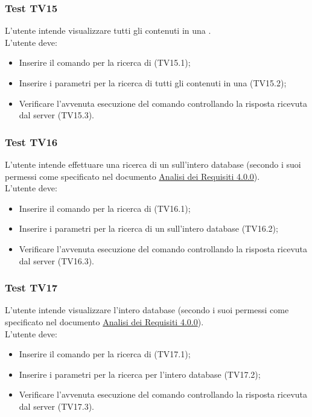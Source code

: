 \documentclass{scalatekids-article}
\begin{document}
\subsubsection{Test TV15}

L'utente intende visualizzare tutti gli  contenuti in una .\\
L'utente deve:
\begin{itemize}
\item Inserire il comando per la ricerca di  (TV15.1);
\item Inserire i parametri per la ricerca di tutti gli  contenuti in una  (TV15.2);
\item Verificare l'avvenuta esecuzione del comando controllando la risposta ricevuta dal server (TV15.3).
\end{itemize}

\subsubsection{Test TV16}

L'utente intende effettuare una ricerca di un  sull'intero database (secondo i suoi permessi come specificato nel documento \href{run:../Esterni/AnalisiDeiRequisiti\_v4.0.0.pdf}{Analisi dei Requisiti 4.0.0}).\\
L'utente deve:
\begin{itemize}
\item Inserire il comando per la ricerca di  (TV16.1);
\item Inserire i parametri per la ricerca di un  sull'intero database (TV16.2);
\item Verificare l'avvenuta esecuzione del comando controllando la risposta ricevuta dal server (TV16.3).
\end{itemize}

\subsubsection{Test TV17}

L'utente intende visualizzare l'intero database (secondo i suoi permessi come specificato nel documento \href{run:../Esterni/AnalisiDeiRequisiti\_v4.0.0.pdf}{Analisi dei Requisiti 4.0.0}).\\
L'utente deve:
\begin{itemize}
\item Inserire il comando per la ricerca di  (TV17.1);
\item Inserire i parametri per la ricerca per l'intero database (TV17.2);
\item Verificare l'avvenuta esecuzione del comando controllando la risposta ricevuta dal server (TV17.3).
\end{itemize}
\end{document}
